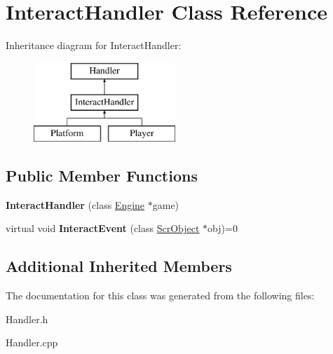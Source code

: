 \hypertarget{class_interact_handler}{}\section{Interact\+Handler Class Reference}
\label{class_interact_handler}
Inheritance diagram for Interact\+Handler\+:\begin{figure}[H]
\begin{center}
\leavevmode
\includegraphics[height=3.000000cm]{class_interact_handler}
\end{center}
\end{figure}
\subsection*{Public Member Functions}
\begin{DoxyCompactItemize}
\item 
\hypertarget{class_interact_handler_a7a5a23fb8b7ab66282fa7e9e7f5f6004}{}\label{class_interact_handler_a7a5a23fb8b7ab66282fa7e9e7f5f6004} 
{\bfseries Interact\+Handler} (class \hyperlink{class_engine}{Engine} $\ast$game)
\item 
\hypertarget{class_interact_handler_a3c493434e2cd4e5b9ca4843005ed73cb}{}\label{class_interact_handler_a3c493434e2cd4e5b9ca4843005ed73cb} 
virtual void {\bfseries Interact\+Event} (class \hyperlink{class_scr_object}{Scr\+Object} $\ast$obj)=0
\end{DoxyCompactItemize}
\subsection*{Additional Inherited Members}


The documentation for this class was generated from the following files\+:\begin{DoxyCompactItemize}
\item 
Handler.\+h\item 
Handler.\+cpp\end{DoxyCompactItemize}
